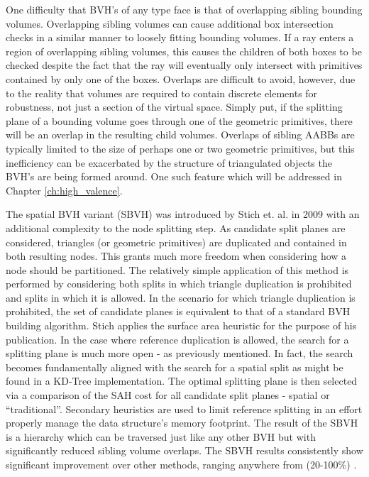 One difficulty that BVH's of any type face is that of overlapping sibling
bounding volumes. Overlapping sibling volumes can cause additional box
intersection checks in a similar manner to loosely fitting bounding volumes. If
a ray enters a region of overlapping sibling volumes, this causes the children
of both boxes to be checked despite the fact that the ray will eventually only
intersect with primitives contained by only one of the boxes. Overlaps are
difficult to avoid, however, due to the reality that volumes are required to
contain discrete elements for robustness, not just a section of the virtual
space. Simply put, if the splitting plane of a bounding volume goes through one
of the geometric primitives, there will be an overlap in the resulting child
volumes. Overlaps of sibling AABBs are typically limited to the size of perhaps
one or two geometric primitives, but this inefficiency can be exacerbated by the
structure of triangulated objects the BVH's are being formed around. One such
feature which will be addressed in Chapter \ref{ch:high_valence}.

The spatial BVH variant (SBVH) was introduced by Stich et. al. in 2009
\cite{Stich_2009} with an additional complexity to the node splitting step. As
candidate split planes are considered, triangles (or
geometric primitives) are duplicated and contained in both resulting nodes. This grants much
more freedom when considering how a node should be partitioned. The relatively simple application of this
method is performed by considering both splits in which triangle duplication is
prohibited and splits in which it is allowed. In the scenario for which triangle
duplication is prohibited, the set of candidate planes is equivalent to that of
a standard BVH building algorithm. Stich applies the surface area heuristic for
the purpose of his publication. In the case where reference duplication is
allowed, the search for a splitting plane is much more open - as previously
mentioned. In fact, the search becomes fundamentally aligned with the search for
a spatial split as might be found in a KD-Tree implementation. The optimal
splitting plane is then selected via a comparison of the SAH cost for all
candidate split planes - spatial or ``traditional''. Secondary heuristics are used
to limit reference splitting in an effort properly manage the data structure's
memory footprint. The result of the SBVH is a hierarchy which can be traversed
just like any other BVH but with significantly reduced sibling volume
overlaps. The SBVH results consistently show significant improvement over other
methods, ranging anywhere from (20-100\%) \cite{Stich_2009}.

